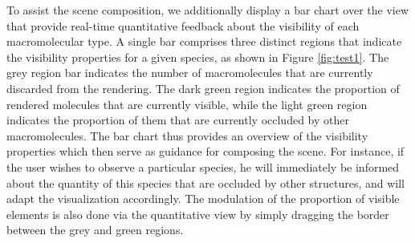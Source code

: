 To assist the scene composition, we additionally display a bar chart over the view that provide real-time quantitative feedback about the visibility of each macromolecular type.
A single bar comprises three distinct regions that indicate the visibility properties for a given species, as shown in Figure \ref{fig:test1}.
The grey region bar indicates the number of macromolecules that are currently discarded from the rendering.
The dark green region indicates the proportion of rendered molecules that are currently visible, while the light green region indicates the proportion of them that are currently occluded by other macromolecules.
The bar chart thus provides an overview of the visibility properties which then serve as guidance for composing the scene.
For instance, if the user wishes to observe a particular species, he will immediately be informed about the quantity of this species that are occluded by other structures, and will adapt the visualization accordingly.
The modulation of the proportion of visible elements is also done via the quantitative view by simply dragging the border between the grey and green regions.

